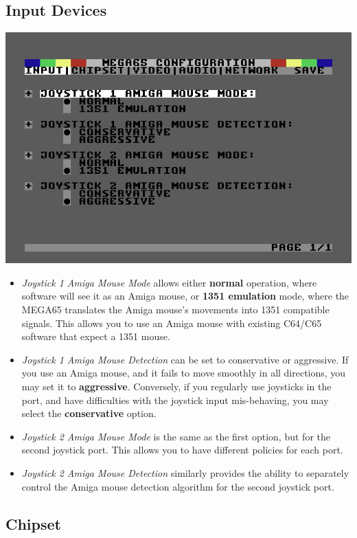 \subsection{Input Devices}

\includegraphics[width=\linewidth]{images/ss-m65config-1.png}

\begin{itemize}
  \item{\em Joystick 1 Amiga Mouse Mode} allows either {\bf normal} operation,
    where software will see it as an Amiga mouse, or {\bf 1351
      emulation} mode, where the MEGA65 translates the Amiga mouse's
    movements into 1351 compatible signals. This allows you to use an
    Amiga mouse with existing C64/C65 software that expect a 1351
    mouse.
  \item{\em Joystick 1 Amiga Mouse Detection} can be set to conservative
    or aggressive.  If you use an Amiga mouse, and it fails to move
    smoothly in all directions, you may set it to {\bf
      aggressive}. Conversely, if you regularly use joysticks in the
    port, and have difficulties with the joystick input
    mis-behaving, you may select the {\bf conservative}
    option.
  \item{\em Joystick 2 Amiga Mouse Mode} is the same as the first
    option, but for the second joystick port. This allows you to
    have different policies for each port.
  \item{\em Joystick 2 Amiga Mouse Detection} similarly provides the
    ability to separately control the Amiga mouse detection
    algorithm for the second joystick port.
\end{itemize}


\subsection{Chipset}

